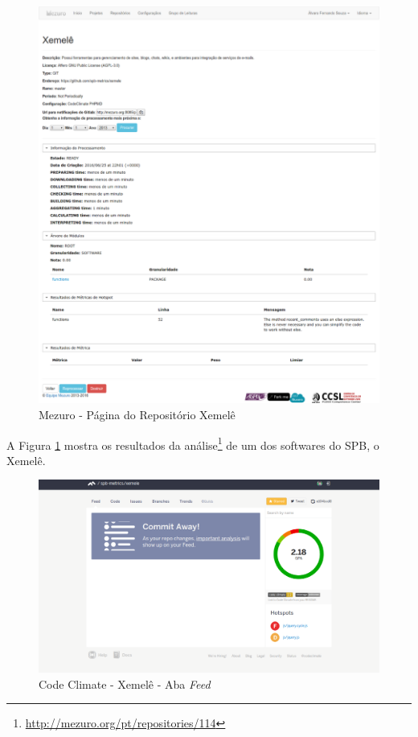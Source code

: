 \begin{figure}[!htb]
	\centering
    \includegraphics[keepaspectratio=true,scale=0.3]
    {figuras/mezuro-repositorio-view.eps}
  \caption{Mezuro - Página do Repositório Xemelê}
	\label{fig:mezuro-repositorio-view-xemele}
\end{figure}

\newpage

A Figura \ref{fig:mezuro-repositorio-view-xemele}
mostra os resultados da análise\footnote{\url{http://mezuro.org/pt/repositories/114}}
de um dos softwares do SPB, o Xemelê.

\newpage

\begin{figure}[!htb]
	\centering
    \includegraphics[keepaspectratio=true,scale=0.35]
    {figuras/codeclimate_feed.eps}
  \caption{Code Climate - Xemelê - Aba \textit{Feed}}
	\label{fig:codeclimate_feed}
\end{figure}

